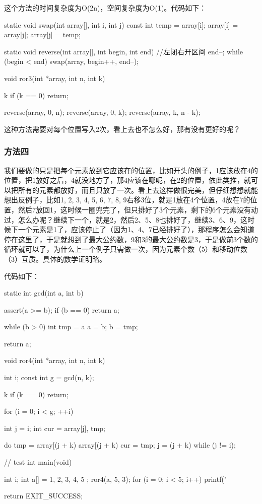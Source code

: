 这个方法的时间复杂度为O(2n)，空间复杂度为O(1)。代码如下：

\begin{Codex}[label=ror.c]
static void swap(int array[], int i, int j) {
    const int temp = array[i];
    array[i] = array[j];
    array[j] = temp;
}

static void reverse(int array[], int begin, int end) { //左闭右开区间
    end--;
    while (begin < end)
        swap(array, begin++, end--);
}

void ror3(int *array, int n, int k) {
    k %
    if (k == 0)
        return;

    reverse(array, 0, n);
    reverse(array, 0, k);
    reverse(array, k, n - k);
}
\end{Codex}

这种方法需要对每个位置写入2次，看上去也不怎么好，那有没有更好的呢？

\subsubsection{方法四}
我们要做的只是把每个元素放到它应该在的位置，比如开头的例子，1应该放在4的位置，把1放好之后，4就没地方了，那4应该在哪呢，在2的位置，依此类推，就可以把所有的元素都放好，而且只放了一次。看上去这样做很完美，但仔细想想就能想出反例子，比如{1, 2, 3, 4, 5, 6, 7, 8, 9}右移3位，就是1放在4个位置，4放在7的位置，然后7放回1，这时候一圈兜完了，但只排好了3个元素，剩下的6个元素没有动过，怎么办呢？继续下一个，就是2，然后2、5、8也排好了，继续3、6、9，这时候下一个元素是1了，应该停止了（因为1、4、7已经排好了），那程序怎么会知道停在这里了，于是就想到了最大公约数，9和3的最大公约数是3，于是做前3个数的循环就可以了，为什么上一个例子只需做一次，因为元素个数（5）和移动位数（3）互质。具体的数学证明略。

代码如下：

\begin{Codex}[label=ror.c]
static int gcd(int a, int b) {
    assert(a >= b);
    if (b == 0) {
        return a;
    }

    while (b > 0) {
        int tmp = a %
        a = b;
        b = tmp;
    }

    return a;
}

void ror4(int *array, int n, int k) {
    int i;
    const int g = gcd(n, k);

    k %
    if (k == 0)
        return;

    for (i = 0; i < g; ++i) {
        int j = i;
        int cur = array[j], tmp;

        do {
            tmp = array[(j + k) %
            array[(j + k) %
            cur = tmp;
            j = (j + k) %
        } while (j != i);
    }
}

// test
int main(void) {
    int i;
    int a[] = { 1, 2, 3, 4, 5 };
    ror4(a, 5, 3);
    for (i = 0; i < 5; i++) {
        printf("%
    }

    return EXIT_SUCCESS;
}
\end{Codex}
